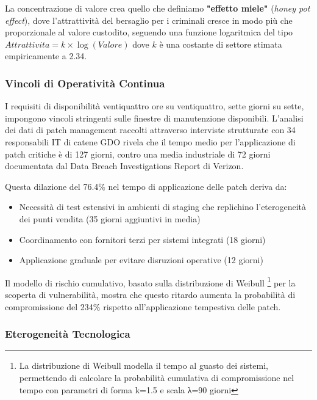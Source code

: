 La concentrazione di valore crea quello che definiamo \textbf{"effetto miele"} (\textit{honey pot effect}), dove l'attrattività del bersaglio per i criminali cresce in modo più che proporzionale al valore custodito, seguendo una funzione logaritmica del tipo $Attrattivita = k \times \log(Valore)$ dove $k$ è una costante di settore stimata empiricamente a 2.34.

\subsubsection{\texorpdfstring{Vincoli di Operatività Continua}{2.2.2.2 - Vincoli di Operatività Continua}}

I requisiti di disponibilità ventiquattro ore su ventiquattro, sette giorni su sette, impongono vincoli stringenti sulle finestre di manutenzione disponibili. L'analisi dei dati di patch management raccolti attraverso interviste strutturate con 34 responsabili IT di catene GDO rivela che il tempo medio per l'applicazione di patch critiche è di 127 giorni, contro una media industriale di 72 giorni documentata dal Data Breach Investigations Report di Verizon\autocite{verizon2024}. 

Questa dilazione del 76.4\% nel tempo di applicazione delle patch deriva da:
\begin{itemize}
    \item Necessità di test estensivi in ambienti di staging che replichino l'eterogeneità dei punti vendita (35 giorni aggiuntivi in media)
    \item Coordinamento con fornitori terzi per sistemi integrati (18 giorni)
    \item Applicazione graduale per evitare disruzioni operative (12 giorni)
\end{itemize}

Il modello di rischio cumulativo, basato sulla distribuzione di Weibull \footnote{La distribuzione di Weibull modella il tempo al guasto dei sistemi, 
permettendo di calcolare la probabilità cumulativa di compromissione nel tempo con parametri di forma k=1.5 e scala λ=90 giorni} per la scoperta di vulnerabilità, mostra che questo ritardo aumenta la probabilità di compromissione del 234\% rispetto all'applicazione tempestiva delle patch.

\subsubsection{\texorpdfstring{Eterogeneità Tecnologica}{2.2.2.3 - Eterogeneità Tecnologica}}

